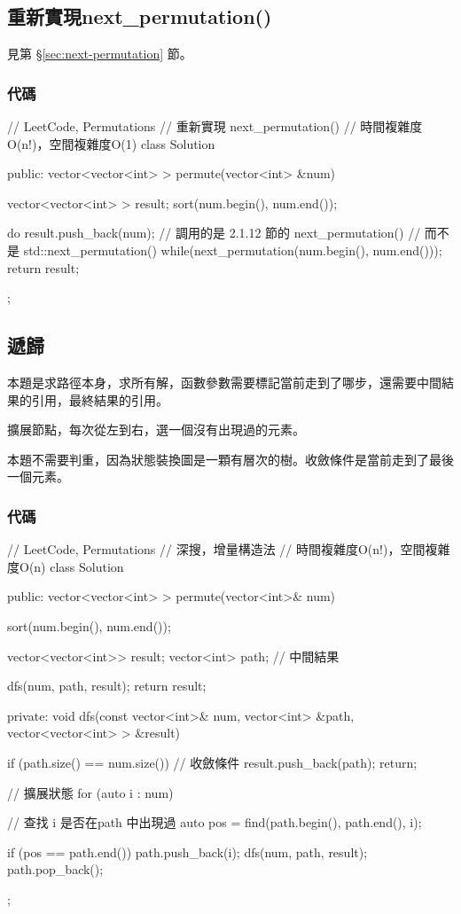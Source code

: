 \subsection{重新實現next_permutation()}
見第 \S \ref{sec:next-permutation} 節。


\subsubsection{代碼}
\begin{Code}
// LeetCode, Permutations
// 重新實現 next_permutation()
// 時間複雜度O(n!)，空間複雜度O(1)
class Solution {
public:
    vector<vector<int> > permute(vector<int> &num) {
        vector<vector<int> > result;
        sort(num.begin(), num.end());

        do {
            result.push_back(num);
        // 調用的是 2.1.12 節的 next_permutation()
        // 而不是 std::next_permutation()
        } while(next_permutation(num.begin(), num.end()));
        return result;
    }
};
\end{Code}


\subsection{遞歸}
本題是求路徑本身，求所有解，函數參數需要標記當前走到了哪步，還需要中間結果的引用，最終結果的引用。

擴展節點，每次從左到右，選一個沒有出現過的元素。

本題不需要判重，因為狀態裝換圖是一顆有層次的樹。收斂條件是當前走到了最後一個元素。

\subsubsection{代碼}
\begin{Code}
// LeetCode, Permutations
// 深搜，增量構造法
// 時間複雜度O(n!)，空間複雜度O(n)
class Solution {
public:
    vector<vector<int> > permute(vector<int>& num) {
        sort(num.begin(), num.end());

        vector<vector<int>> result;
        vector<int> path;  // 中間結果

        dfs(num, path, result);
        return result;
    }
private:
    void dfs(const vector<int>& num, vector<int> &path,
            vector<vector<int> > &result) {
        if (path.size() == num.size()) {  // 收斂條件
            result.push_back(path);
            return;
        }

        // 擴展狀態
        for (auto i : num) {
            // 查找 i 是否在path 中出現過
            auto pos = find(path.begin(), path.end(), i);

            if (pos == path.end()) {
                path.push_back(i);
                dfs(num, path, result);
                path.pop_back();
            }
        }
    }
};
\end{Code}


